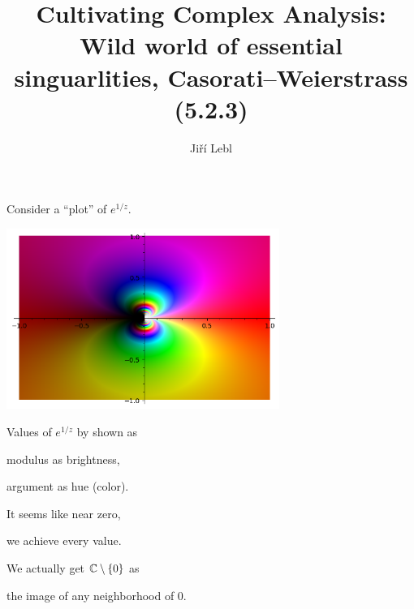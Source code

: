 \documentclass[10pt,aspectratio=169]{beamer}
\author{Ji\v{r}\'i Lebl}
\institute[OSU]{%
Departemento pri Matematiko de Oklahoma {\^S}tata Universitato}
\title{Cultivating Complex Analysis:\\%
Wild world of essential singuarlities, Casorati--Weierstrass (5.2.3)}
\date{}
\begin{document}
\begin{frame}
\titlepage
\end{frame}

\begin{frame}
Consider a ``plot'' of $e^{1/z}$.

\vspace*{-15pt}
\hspace*{2.2in}\includegraphics[width=3.5in]{essential-sing.png}

\vspace*{-2.05in}
Values of $e^{1/z}$ by shown as

\medskip
modulus as brightness,

\medskip
argument as hue (color).

\medskip
\pause

It seems like near zero,

we achieve every value.

\medskip
\pause

We actually get ${\mathbb{C}} \setminus \{ 0 \}$ as

the image of any neighborhood of $0$.

\end{frame}
\end{document}
